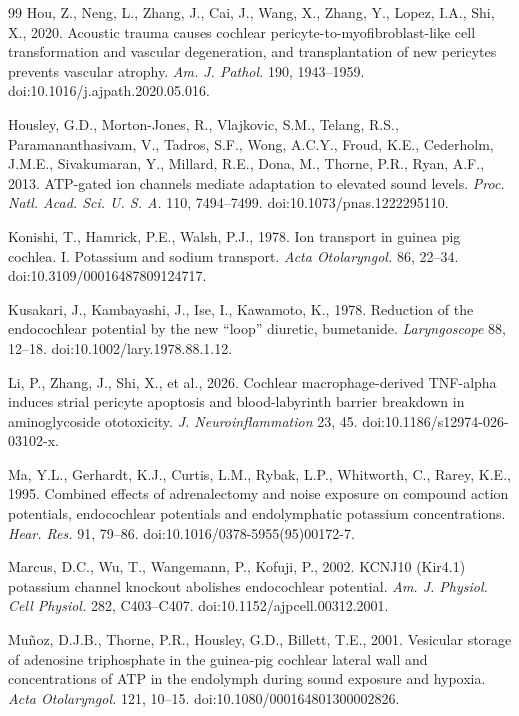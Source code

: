 \documentclass[final,5p,times]{elsarticle}
\begin{document}
\begin{thebibliography}{99}
Hou, Z., Neng, L., Zhang, J., Cai, J., Wang, X., Zhang, Y., Lopez, I.A., Shi, X., 2020. Acoustic trauma causes cochlear pericyte-to-myofibroblast-like cell transformation and vascular degeneration, and transplantation of new pericytes prevents vascular atrophy. \emph{Am. J. Pathol.} 190, 1943--1959. doi:10.1016/j.ajpath.2020.05.016.

Housley, G.D., Morton-Jones, R., Vlajkovic, S.M., Telang, R.S., Paramananthasivam, V., Tadros, S.F., Wong, A.C.Y., Froud, K.E., Cederholm, J.M.E., Sivakumaran, Y., Millard, R.E., Dona, M., Thorne, P.R., Ryan, A.F., 2013. ATP-gated ion channels mediate adaptation to elevated sound levels. \emph{Proc. Natl. Acad. Sci. U. S. A.} 110, 7494--7499. doi:10.1073/pnas.1222295110.

Konishi, T., Hamrick, P.E., Walsh, P.J., 1978. Ion transport in guinea pig cochlea. I. Potassium and sodium transport. \emph{Acta Otolaryngol.} 86, 22--34. doi:10.3109/00016487809124717.

Kusakari, J., Kambayashi, J., Ise, I., Kawamoto, K., 1978. Reduction of the endocochlear potential by the new ``loop'' diuretic, bumetanide. \emph{Laryngoscope} 88, 12--18. doi:10.1002/lary.1978.88.1.12.

Li, P., Zhang, J., Shi, X., et al., 2026. Cochlear macrophage-derived TNF-alpha induces strial pericyte apoptosis and blood-labyrinth barrier breakdown in aminoglycoside ototoxicity. \emph{J. Neuroinflammation} 23, 45. doi:10.1186/s12974-026-03102-x.

Ma, Y.L., Gerhardt, K.J., Curtis, L.M., Rybak, L.P., Whitworth, C., Rarey, K.E., 1995. Combined effects of adrenalectomy and noise exposure on compound action potentials, endocochlear potentials and endolymphatic potassium concentrations. \emph{Hear. Res.} 91, 79--86. doi:10.1016/0378-5955(95)00172-7.

Marcus, D.C., Wu, T., Wangemann, P., Kofuji, P., 2002. KCNJ10 (Kir4.1) potassium channel knockout abolishes endocochlear potential. \emph{Am. J. Physiol. Cell Physiol.} 282, C403--C407. doi:10.1152/ajpcell.00312.2001.

Muñoz, D.J.B., Thorne, P.R., Housley, G.D., Billett, T.E., 2001. Vesicular storage of adenosine triphosphate in the guinea-pig cochlear lateral wall and concentrations of ATP in the endolymph during sound exposure and hypoxia. \emph{Acta Otolaryngol.} 121, 10--15. doi:10.1080/000164801300002826.


\end{thebibliography}
\end{document}
